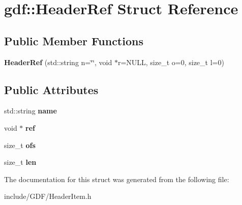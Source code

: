 \hypertarget{structgdf_1_1_header_ref}{
\section{gdf::HeaderRef Struct Reference}
\label{structgdf_1_1_header_ref}
}
\subsection*{Public Member Functions}
\begin{DoxyCompactItemize}
\item 
\hypertarget{structgdf_1_1_header_ref_a77d569b72d944639f9b2d8b83260cec7}{
{\bfseries HeaderRef} (std::string n=\char`\"{}\char`\"{}, void $\ast$r=NULL, size\_\-t o=0, size\_\-t l=0)}
\label{structgdf_1_1_header_ref_a77d569b72d944639f9b2d8b83260cec7}

\end{DoxyCompactItemize}
\subsection*{Public Attributes}
\begin{DoxyCompactItemize}
\item 
\hypertarget{structgdf_1_1_header_ref_a19f94b2d3a392ae1790c2b463b4d09af}{
std::string {\bfseries name}}
\label{structgdf_1_1_header_ref_a19f94b2d3a392ae1790c2b463b4d09af}

\item 
\hypertarget{structgdf_1_1_header_ref_afa9d3f2d40585bfe74a923b31c656b8a}{
void $\ast$ {\bfseries ref}}
\label{structgdf_1_1_header_ref_afa9d3f2d40585bfe74a923b31c656b8a}

\item 
\hypertarget{structgdf_1_1_header_ref_ad9fe9768e64fcc7bb1c3c01e617ea315}{
size\_\-t {\bfseries ofs}}
\label{structgdf_1_1_header_ref_ad9fe9768e64fcc7bb1c3c01e617ea315}

\item 
\hypertarget{structgdf_1_1_header_ref_a1125928773f5b087849fb07ec6aeb8e3}{
size\_\-t {\bfseries len}}
\label{structgdf_1_1_header_ref_a1125928773f5b087849fb07ec6aeb8e3}

\end{DoxyCompactItemize}


The documentation for this struct was generated from the following file:\begin{DoxyCompactItemize}
\item 
include/GDF/HeaderItem.h\end{DoxyCompactItemize}
